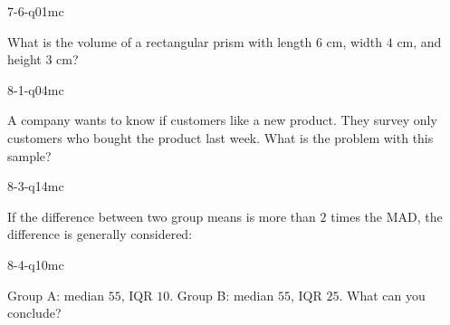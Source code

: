 \begin{practiceQuestion}{7-6-q01}{mc}
\begin{questionText}
What is the volume of a rectangular prism with length $6$ cm, width $4$ cm, and height $3$ cm?
\end{questionText}
\end{practiceQuestion}

\begin{practiceQuestion}{8-1-q04}{mc}
\begin{questionText}
A company wants to know if customers like a new product. They survey only customers who bought the product last week. What is the problem with this sample?
\end{questionText}
\end{practiceQuestion}

\begin{practiceQuestion}{8-3-q14}{mc}
\begin{questionText}
If the difference between two group means is more than $2$ times the MAD, the difference is generally considered:
\end{questionText}
\end{practiceQuestion}

\begin{practiceQuestion}{8-4-q10}{mc}
\begin{questionText}
Group A: median $55$, IQR $10$. Group B: median $55$, IQR $25$. What can you conclude?
\end{questionText}
\end{practiceQuestion}

